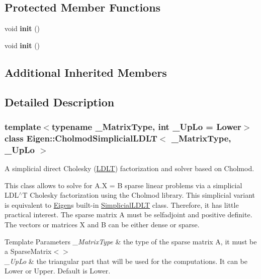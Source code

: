 \subsection*{Protected Member Functions}
\begin{DoxyCompactItemize}
\item 
\mbox{\label{class_eigen_1_1_cholmod_simplicial_l_d_l_t_a368110df5fb61cbebbce2c43bcc8faa7}} 
void {\bfseries init} ()
\item 
\mbox{\label{class_eigen_1_1_cholmod_simplicial_l_d_l_t_a368110df5fb61cbebbce2c43bcc8faa7}} 
void {\bfseries init} ()
\end{DoxyCompactItemize}
\subsection*{Additional Inherited Members}


\subsection{Detailed Description}
\subsubsection*{template$<$typename \+\_\+\+Matrix\+Type, int \+\_\+\+Up\+Lo = Lower$>$\newline
class Eigen\+::\+Cholmod\+Simplicial\+L\+D\+L\+T$<$ \+\_\+\+Matrix\+Type, \+\_\+\+Up\+Lo $>$}

A simplicial direct Cholesky (\hyperlink{group___cholesky___module_class_eigen_1_1_l_d_l_t}{L\+D\+LT}) factorization and solver based on Cholmod. 

This class allows to solve for A.\+X = B sparse linear problems via a simplicial L\+D\+L$^\wedge$T Cholesky factorization using the Cholmod library. This simplicial variant is equivalent to \hyperlink{namespace_eigen}{Eigen}\textquotesingle{}s built-\/in \hyperlink{group___sparse_cholesky___module_class_eigen_1_1_simplicial_l_d_l_t}{Simplicial\+L\+D\+LT} class. Therefore, it has little practical interest. The sparse matrix A must be selfadjoint and positive definite. The vectors or matrices X and B can be either dense or sparse.


\begin{DoxyTemplParams}{Template Parameters}
{\em \+\_\+\+Matrix\+Type} & the type of the sparse matrix A, it must be a Sparse\+Matrix$<$$>$ \\
\hline
{\em \+\_\+\+Up\+Lo} & the triangular part that will be used for the computations. It can be Lower or Upper. Default is Lower.\\
\hline
\end{DoxyTemplParams}


